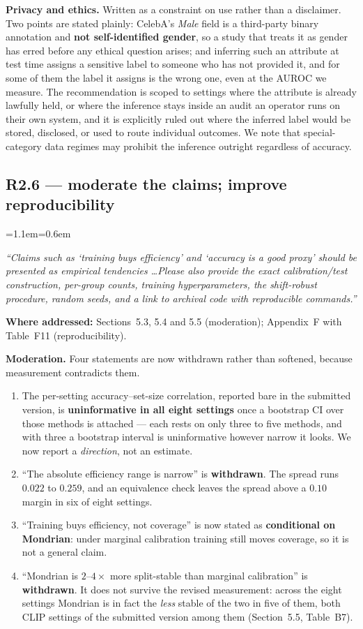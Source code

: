 \documentclass[11pt,a4paper]{article}
\newenvironment{reviewer}
  {\begin{list}{}{\leftmargin=1.1em\rightmargin=0.6em}\item[]\itshape\color{revgrey}\small}
  {\end{list}}
\newcommand{\where}[1]{{\textbf{Where addressed:} #1\par}}
\newcommand{\rpoint}[2]{\subsection*{#1 --- #2}}
\begin{document}
\textbf{Privacy and ethics.} Written as a constraint on use rather than a disclaimer. Two points are
stated plainly: CelebA's \emph{Male} field is a third-party binary annotation and \textbf{not
self-identified gender}, so a study that treats it as gender has erred before any ethical question
arises; and inferring such an attribute at test time assigns a sensitive label to someone who has
not provided it, and for some of them the label it assigns is the wrong one, even at the AUROC we
measure. The recommendation
is scoped to settings where the attribute is already lawfully held, or where the inference stays
inside an audit an operator runs on their own system, and it is explicitly ruled out where the
inferred label would be stored, disclosed, or used to route individual outcomes. We note that
special-category data regimes may prohibit the inference outright regardless of accuracy.

\rpoint{R2.6}{moderate the claims; improve reproducibility}

\begin{reviewer}
``Claims such as `training buys efficiency' and `accuracy is a good proxy' should be presented as
empirical tendencies \ldots Please also provide the exact calibration/test construction, per-group
counts, training hyperparameters, the shift-robust procedure, random seeds, and a link to archival
code with reproducible commands.''
\end{reviewer}

\where{Sections~5.3, 5.4 and 5.5 (moderation); Appendix~F with Table~F11 (reproducibility).}

\textbf{Moderation.} Four statements are now withdrawn rather than softened, because measurement
contradicts them.

\begin{enumerate}[leftmargin=1.4em,itemsep=0.35em]
\item The per-setting accuracy--set-size correlation, reported bare in the submitted version, is
\textbf{uninformative in all eight settings} once a bootstrap CI over those methods is
attached --- each rests on only three to five methods, and with three a bootstrap interval is
uninformative however narrow it looks. We now report a \emph{direction}, not an estimate.
\item ``The absolute efficiency range is narrow'' is \textbf{withdrawn}. The spread runs $0.022$ to
$0.259$, and an equivalence check leaves the spread above a $0.10$ margin in six of
eight settings.
\item ``Training buys efficiency, not coverage'' is now stated as \textbf{conditional on Mondrian}:
under marginal calibration training still moves coverage, so it is not a general claim.
\item ``Mondrian is $2$--$4\times$ more split-stable than marginal calibration'' is
\textbf{withdrawn}. It does not survive the revised measurement: across
the eight settings Mondrian is in fact the \emph{less} stable of the two in five of them, both CLIP
settings of the submitted version among them (Section~5.5, Table~B7).
\end{enumerate}
\end{document}
